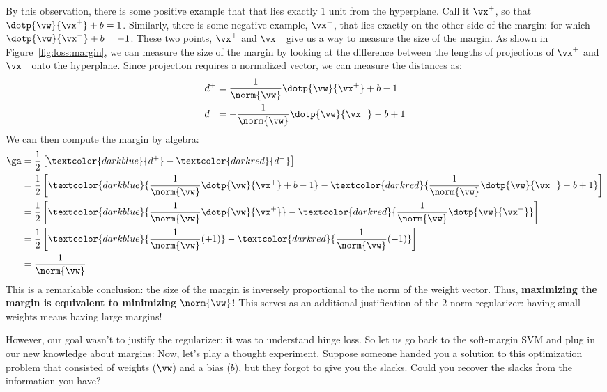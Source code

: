 By this observation, there is some positive example that that lies
exactly $1$ unit from the hyperplane.  Call it $\vx^+$, so that
$\dotp{\vw}{\vx^+}+b = 1$.  Similarly, there is some negative example,
$\vx^-$, that lies exactly on the other side of the margin: for which
$\dotp{\vw}{\vx^-}+b = -1$.  These two points, $\vx^+$ and $\vx^-$ give
us a way to measure the size of the margin.  As shown in
Figure~\ref{fig:loss:margin}, we can measure the size of the margin by
looking at the difference between the lengths of projections of
$\vx^+$ and $\vx^-$ onto the hyperplane.  Since projection requires a
normalized vector, we can measure the distances as:
%
\begin{align}
d^+ &= \frac 1 {\norm{\vw}} \dotp{\vw}{\vx^+} + b - 1 \\
d^- &= - \frac 1 {\norm{\vw}} \dotp{\vw}{\vx^-} - b + 1
\end{align}
%
We can then compute the margin by algebra:
%
\begin{align}
\ga
&= \frac 1 2 \left[ \textcolor{darkblue}{d^+}
                  - \textcolor{darkred}{d^-} \right] \\
&= \frac 1 2
   \left[
   \textcolor{darkblue}{\frac 1 {\norm{\vw}} \dotp{\vw}{\vx^+} + b - 1}
 - \textcolor{darkred}{\frac 1 {\norm{\vw}} \dotp{\vw}{\vx^-} - b + 1}
   \right]
\\
&= \frac 1 2 \left[
   \textcolor{darkblue}{\frac 1 {\norm{\vw}} \dotp{\vw}{\vx^+}}
 - \textcolor{darkred}{\frac 1 {\norm{\vw}} \dotp{\vw}{\vx^-}}
 \right]
\\
&= \frac 1 2 \left[
   \textcolor{darkblue}{\frac 1 {\norm{\vw}} (+1) }
 - \textcolor{darkred}{\frac 1 {\norm{\vw}} (-1) }
 \right]
\\
&= \frac 1 {\norm{\vw}}
\end{align}
%
This is a remarkable conclusion: the size of the margin is inversely
proportional to the norm of the weight vector.  Thus, {\bf maximizing
  the margin is equivalent to minimizing $\norm{\vw}$!}  This serves
as an additional justification of the $2$-norm regularizer: having
small weights means having large margins!

However, our goal wasn't to justify the regularizer: it was to
understand hinge loss.  So let us go back to the soft-margin SVM and
plug in our new knowledge about margins:
%
%
Now, let's play a thought experiment.  Suppose someone handed you a
solution to this optimization problem that consisted of weights
($\vw$) and a bias ($b$), but they forgot to give you the slacks.
Could you recover the slacks from the information you have?

